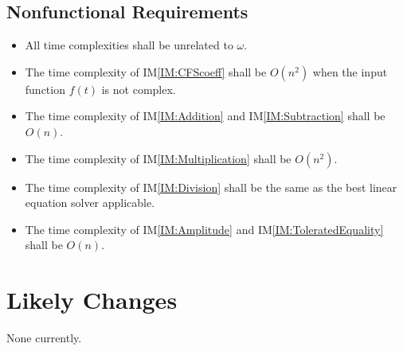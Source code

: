 \documentclass[12pt]{article}
\newcommand{\iref}[1]{IM\ref{#1}}
\newcounter{lcnum} %
\begin{document}
\subsection{Nonfunctional Requirements}

\begin{itemize}
	\item All time complexities shall be unrelated to $\omega$.
	\item The time complexity of \iref{IM:CFScoeff} shall be $O(n^2)$ when the input function $f(t)$ is not complex.
	\item The time complexity of \iref{IM:Addition} and \iref{IM:Subtraction}  shall be $O(n)$.
	\item The time complexity of \iref{IM:Multiplication} shall be $O(n^2)$.
	\item The time complexity of \iref{IM:Division} shall be the same as the best linear equation solver applicable.
	\item The time complexity of \iref{IM:Amplitude} and \iref{IM:ToleratedEquality} shall be $O(n)$.
\end{itemize}

\section{Likely Changes}    
None currently.
\end{document}
